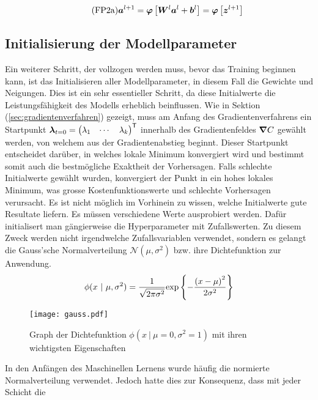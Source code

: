 \begin{equation}\tag{FP2a}\label{eq:aktivierung_matrix}
  \bm{a}^{l+1} = \bm{\varphi} \left[\bm{W}^{l} \bm{a}^{l} + \bm{b}^{l} \right] = \bm{\varphi} \left[ \bm{z}^{l+1} \right]
\end{equation}

\para{}
\cite{Nielsen}

\subsection{Initialisierung der Modellparameter}\label{sec:parameter_initalisieren}
Ein weiterer Schritt, der vollzogen werden muss, bevor das Training beginnen kann, ist das
Initialisieren aller Modellparameter, in diesem Fall die Gewichte und Neigungen.
Dies ist ein sehr essentieller Schritt, da diese Initialwerte die
Leistungsfähigkeit des Modells erheblich beinflussen.
\para{}
Wie in Sektion (\ref{sec:gradientenverfahren}) gezeigt, muss am Anfang des
Gradientenverfahrens ein Startpunkt $\bm{\lambda}_{t=0} = \begin{pmatrix}
    \lambda_1 & \cdots & \lambda_k \end{pmatrix}^{\mathsf{T}}$ innerhalb des Gradientenfeldes
$\bm{\nabla}C$ gewählt werden, von welchem aus der Gradientenabstieg beginnt.
Dieser Startpunkt entscheidet darüber, in welches lokale Minimum konvergiert
wird und bestimmt somit auch die bestmögliche Exaktheit der Vorhersagen. Falls
schlechte Initialwerte gewählt wurden, konvergiert der Punkt in ein hohes lokales
Minimum, was grosse Kostenfunktionswerte und schlechte Vorhersagen verursacht.
\para{}
Es ist nicht möglich im Vorhinein zu wissen, welche Initialwerte gute Resultate
liefern. Es müssen verschiedene Werte ausprobiert werden. Dafür initialisert man gängierweise die
Hyperparameter mit Zufallswerten. Zu diesem Zweck werden nicht irgendwelche
Zufallsvariablen verwendet, sondern es gelangt die Gauss'sche Normalverteilung
$\mathcal{N}(\mu,\sigma^2)$ bzw. ihre Dichtefunktion zur Anwendung.
\[\displaystyle \phi(x\ |\ \mu,\sigma^2) = \frac{1}{\sqrt{2\pi\sigma^2}} \text{exp} \left\{-\frac{{(x-\mu)}^2}{2\sigma^2}\right\} \]
\para{}
\begin{figure}[h!]
  \centering
  \texttt{[image: gauss.pdf]}
  \caption{Graph der Dichtefunktion $\phi(x\ |\ \mu=0,\sigma^2=1)$ mit ihren
    wichtigsten Eigenschaften}%
\end{figure}
In den Anfängen des Maschinellen Lernens wurde häufig die normierte
Normalverteilung verwendet. Jedoch hatte dies zur Konsequenz, dass mit jeder Schicht die
